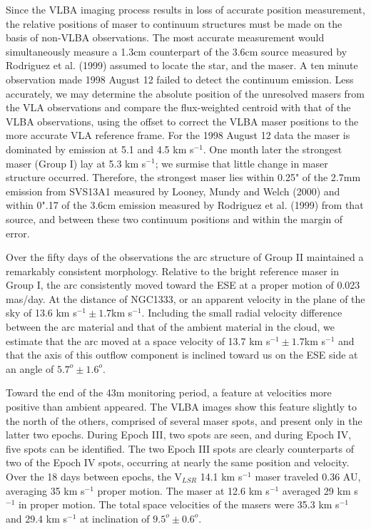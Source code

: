 	Since the VLBA imaging process results in loss of accurate position measurement, the relative positions of maser to continuum structures must be made on the basis of non-VLBA observations.  The most accurate measurement would simultaneously measure a 1.3cm counterpart of the 3.6cm source measured by Rodriguez et al. (1999) assumed to locate the star, and the maser. A ten minute observation made 1998 August 12 failed to detect the continuum emission.  Less accurately, we may determine the absolute position of the unresolved masers from the VLA observations and compare the flux-weighted centroid with that of the VLBA observations, using the offset to correct the VLBA maser positions to the more accurate VLA reference frame. For the 1998 August 12 data the maser is dominated by emission at 5.1 and 4.5 km s$^{-1}$.  One month later the strongest maser (Group I) lay at 5.3 km s$^{-1}$; we surmise that little change in maser structure occurred.  Therefore, the strongest maser lies within 0.25" of the 2.7mm emission from SVS13A1 measured by Looney, Mundy and Welch (2000) and within 0".17 of the 3.6cm emission measured by Rodriguez et al. (1999) from that source, and between these two continuum positions and within the margin of error.

	Over the fifty days of the observations the arc structure of Group II maintained a remarkably consistent morphology.  Relative to the bright reference maser in Group I, the arc consistently moved toward the ESE at a proper motion of 0.023 mas/day.  At the distance of NGC1333, or an apparent velocity in the plane of the sky of 13.6 km s$^{-1} \pm  1.7$km s$^{-1}$.  Including the small radial velocity difference between the arc material and that of the ambient material in the cloud, we estimate that the arc moved at a space velocity of 13.7 km s$^{-1} \pm  1.7$km s$^{-1}$ and that the axis of this outflow component is inclined toward us on the ESE side at an angle of $5.7^o \pm 1.6^o$.

	Toward the end of the 43m monitoring period, a feature at velocities more positive than ambient appeared.  The VLBA images show this feature slightly to the north of the others, comprised of several maser spots, and present only in the latter two epochs.  During Epoch III, two spots are seen, and during Epoch IV, five spots can be identified.  The two Epoch III spots are clearly counterparts of two of the Epoch IV spots, occurring at nearly the same position and velocity.  Over the 18 days between epochs, the V$_{LSR}$ 14.1 km s$^{-1}$ maser traveled 0.36 AU, averaging 35 km s$^{-1}$ proper motion.  The maser at 12.6 km s$^{-1}$  averaged 29 km s$^{-1}$ in proper motion.  The total space velocities of the masers were 35.3 km s$^{-1}$ and 29.4 km s$^{-1}$  at inclination of $9.5^o \pm 0.6^o$.

